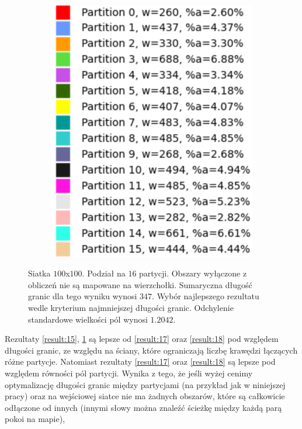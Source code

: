 \begin{figure}[h]
\begin{subfigure}{.33\textwidth}
    \caption[short]{}
\end{subfigure}%
\begin{subfigure}{.33\textwidth}
    \centering
    \includegraphics[width=0.9\linewidth]{images/results/m_k/with/16/results}
    \caption[short]{}
\end{subfigure}
\caption{Siatka $100$x$100$. Podział na $16$ partycji.
Obszary wyłączone z obliczeń nie są mapowane na wierzchołki.
Sumaryczna długość granic dla tego wyniku wynosi $347$.
Wybór najlepszego rezultatu wedle kryterium najmniejszej długości granic.
Odchylenie standardowe wielkości pól wynosi $1.2042$.}
\label{result:16}
\end{figure}
Rezultaty \ref{result:15}, \ref{result:16} są lepsze od \ref{result:17} oraz \ref{result:18} pod względem
długości granic, ze względu na ściany, które ograniczają liczbę krawędzi łączących różne partycje.
Natomiast rezultaty \ref{result:17} oraz \ref{result:18} są lepsze pod względem równości pól partycji.
Wynika z tego, że jeśli wyżej cenimy optymalizację długości granic między partycjami (na przykład jak w niniejszej pracy)
oraz na wejściowej siatce nie ma żadnych obszarów, które są całkowicie odłączone od innych
(innymi słowy można znaleźć ścieżkę między każdą parą pokoi na mapie),
